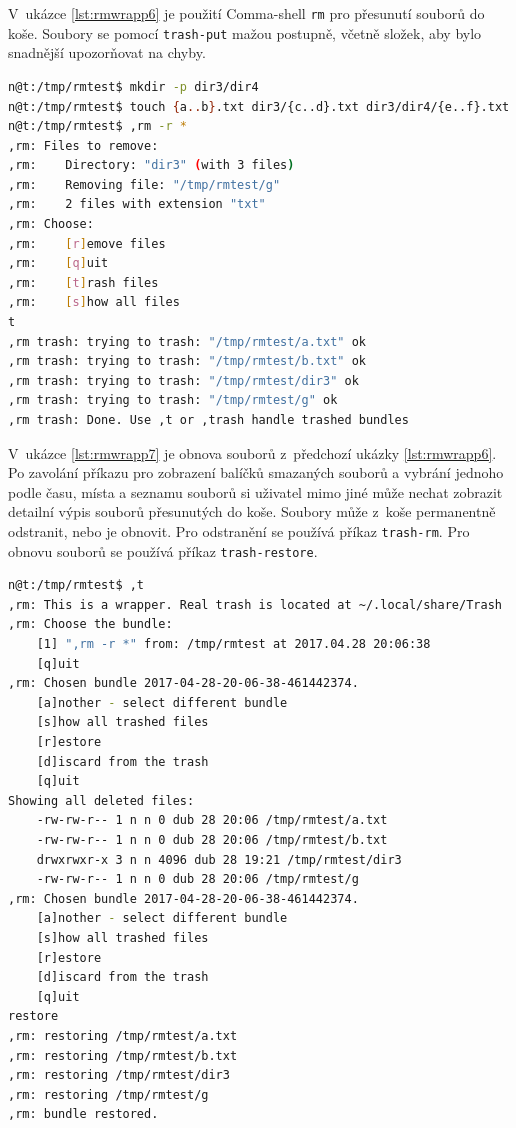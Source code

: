 \documentclass[thesis=M,czech]{FITthesis}[2012/06/26]
\begin{document}
V~ukázce \ref{lst:rmwrapp6} je použití Comma-shell \texttt{rm} pro přesunutí souborů do koše. Soubory se pomocí \texttt{trash-put} mažou postupně, včetně složek, aby bylo snadnější upozorňovat na chyby.

\noindent
\begin{minipage}{\linewidth}
\begin{lstlisting}[language=bash, caption={,rm - přesouvání do koše}, label={lst:rmwrapp6}]
n@t:/tmp/rmtest$ mkdir -p dir3/dir4
n@t:/tmp/rmtest$ touch {a..b}.txt dir3/{c..d}.txt dir3/dir4/{e..f}.txt g
n@t:/tmp/rmtest$ ,rm -r *
,rm: Files to remove:
,rm:    Directory: "dir3" (with 3 files)
,rm:    Removing file: "/tmp/rmtest/g"
,rm:    2 files with extension "txt"
,rm: Choose:
,rm:    [r]emove files
,rm:    [q]uit
,rm:    [t]rash files
,rm:    [s]how all files
t
,rm trash: trying to trash: "/tmp/rmtest/a.txt" ok
,rm trash: trying to trash: "/tmp/rmtest/b.txt" ok
,rm trash: trying to trash: "/tmp/rmtest/dir3" ok
,rm trash: trying to trash: "/tmp/rmtest/g" ok
,rm trash: Done. Use ,t or ,trash handle trashed bundles
\end{lstlisting}
\end{minipage}

V~ukázce \ref{lst:rmwrapp7} je obnova souborů z~předchozí ukázky \ref{lst:rmwrapp6}. Po zavolání příkazu pro zobrazení balíčků smazaných souborů a vybrání jednoho podle času, místa a seznamu souborů si uživatel mimo jiné může nechat zobrazit detailní výpis souborů přesunutých do koše. Soubory může z~koše permanentně odstranit, nebo je obnovit. Pro odstranění se používá příkaz \texttt{trash-rm}. Pro obnovu souborů se používá příkaz \texttt{trash-restore}.

\noindent
\begin{minipage}{\linewidth}
\begin{lstlisting}[language=bash, caption={,rm - obnova souborů }, label={lst:rmwrapp7}]
n@t:/tmp/rmtest$ ,t
,rm: This is a wrapper. Real trash is located at ~/.local/share/Trash
,rm: Choose the bundle:
    [1] ",rm -r *" from: /tmp/rmtest at 2017.04.28 20:06:38
    [q]uit
,rm: Chosen bundle 2017-04-28-20-06-38-461442374.
    [a]nother - select different bundle
    [s]how all trashed files
    [r]estore
    [d]iscard from the trash
    [q]uit
Showing all deleted files:
    -rw-rw-r-- 1 n n 0 dub 28 20:06 /tmp/rmtest/a.txt
    -rw-rw-r-- 1 n n 0 dub 28 20:06 /tmp/rmtest/b.txt
    drwxrwxr-x 3 n n 4096 dub 28 19:21 /tmp/rmtest/dir3
    -rw-rw-r-- 1 n n 0 dub 28 20:06 /tmp/rmtest/g
,rm: Chosen bundle 2017-04-28-20-06-38-461442374.
    [a]nother - select different bundle
    [s]how all trashed files
    [r]estore
    [d]iscard from the trash
    [q]uit
restore
,rm: restoring /tmp/rmtest/a.txt
,rm: restoring /tmp/rmtest/b.txt
,rm: restoring /tmp/rmtest/dir3
,rm: restoring /tmp/rmtest/g
,rm: bundle restored.
\end{lstlisting}
\end{minipage}
\end{document}
